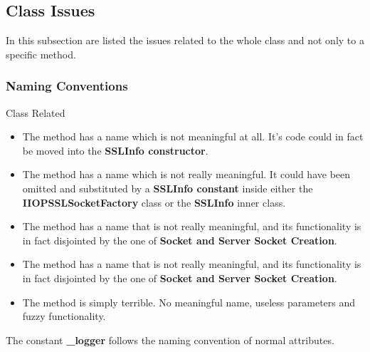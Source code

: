 \subsection{Class Issues}
In this subsection are listed the issues related to the whole class and not only to a specific method.
\subsubsection{Naming Conventions}
\begin{itemize}
	 Class Related
	\begin{itemize}
		\item
		The method
		has a name which is not meaningful at all.
		It's code could in fact be moved into the \textbf{SSLInfo constructor}.
		\item
		The method
		has a name which is not really meaningful.
		It could have been omitted and substituted by a \textbf{SSLInfo constant} inside either the \textbf{IIOPSSLSocketFactory} class or the \textbf{SSLInfo} inner class.
		\item
		The method
		has a name that is not really meaningful, and its functionality is in fact disjointed by the one of \textbf{Socket and Server Socket Creation}.
		\item
		The method 
		has a name that is not really meaningful, and its functionality is in fact disjointed by the one of \textbf{Socket and Server Socket Creation}.
		\item
		The method
		is simply terrible.
		No meaningful name, useless parameters and fuzzy functionality.
	\end{itemize}
	The constant \textbf{\_logger} follows the naming convention of normal attributes.
\end{itemize}

